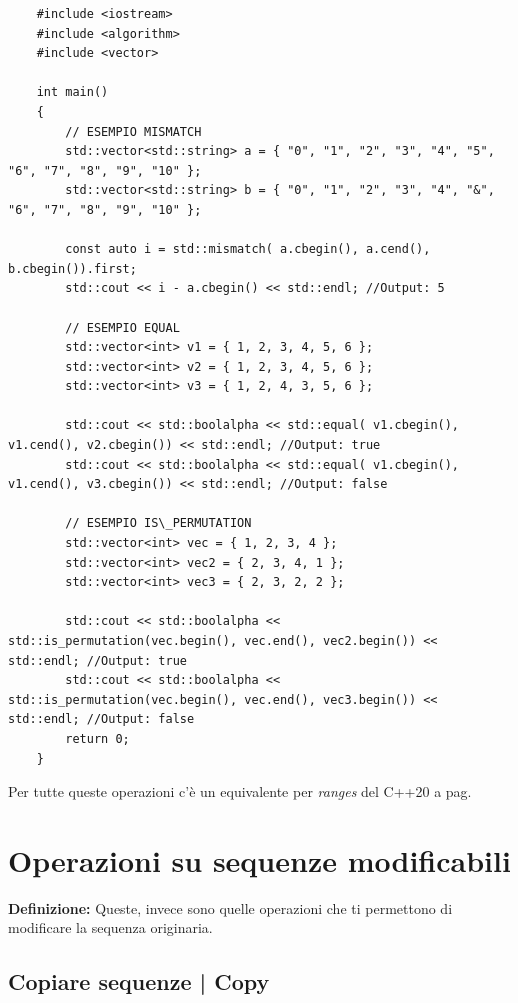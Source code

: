 \begin{lstlisting}
	#include <iostream>
	#include <algorithm>
	#include <vector>
	
	int main()
	{
		// ESEMPIO MISMATCH
		std::vector<std::string> a = { "0", "1", "2", "3", "4", "5", "6", "7", "8", "9", "10" };
		std::vector<std::string> b = { "0", "1", "2", "3", "4", "&", "6", "7", "8", "9", "10" };
		
		const auto i = std::mismatch( a.cbegin(), a.cend(), b.cbegin()).first;
		std::cout << i - a.cbegin() << std::endl; //Output: 5
		
		// ESEMPIO EQUAL
		std::vector<int> v1 = { 1, 2, 3, 4, 5, 6 };
		std::vector<int> v2 = { 1, 2, 3, 4, 5, 6 };
		std::vector<int> v3 = { 1, 2, 4, 3, 5, 6 };
		
		std::cout << std::boolalpha << std::equal( v1.cbegin(), v1.cend(), v2.cbegin()) << std::endl; //Output: true
		std::cout << std::boolalpha << std::equal( v1.cbegin(), v1.cend(), v3.cbegin()) << std::endl; //Output: false
		
		// ESEMPIO IS\_PERMUTATION
		std::vector<int> vec = { 1, 2, 3, 4 };
		std::vector<int> vec2 = { 2, 3, 4, 1 };
		std::vector<int> vec3 = { 2, 3, 2, 2 };
		
		std::cout << std::boolalpha << std::is_permutation(vec.begin(), vec.end(), vec2.begin()) << std::endl; //Output: true
		std::cout << std::boolalpha << std::is_permutation(vec.begin(), vec.end(), vec3.begin()) << std::endl; //Output: false
		return 0;
	}
\end{lstlisting}

\fleuron %

\textsf{\small Per tutte queste operazioni c'è un equivalente per \emph{ranges} del C++20 a pag. \pageref{ranges}} \\


\newpage

\section{Operazioni su sequenze modificabili}

\textsf{\small \textbf{Definizione: } Queste, invece sono quelle operazioni che ti permettono di modificare la sequenza originaria.} \\

\subsection{Copiare sequenze | Copy}

